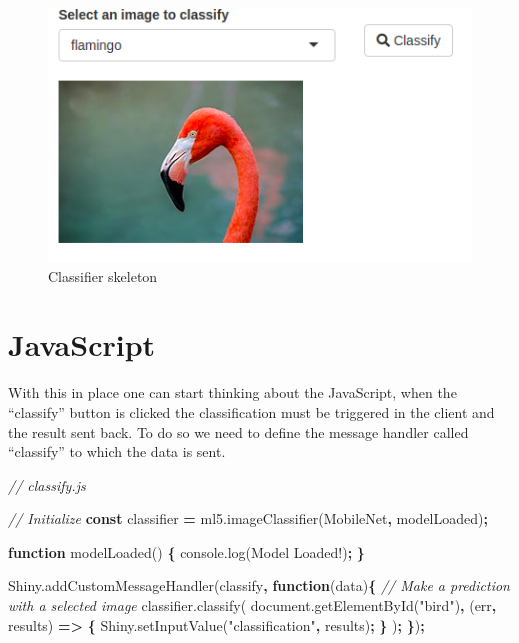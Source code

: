 \documentclass[
]{krantz}
\makeatletter
\newenvironment{Shaded}{\begin{snugshade}}{\end{snugshade}}
\newcommand{\AttributeTok}[1]{\textcolor[rgb]{0.61,0.61,0.61}{#1}}
\newcommand{\CommentTok}[1]{\textcolor[rgb]{0.37,0.37,0.37}{\textit{#1}}}
\newcommand{\KeywordTok}[1]{\textcolor[rgb]{0.27,0.27,0.27}{\textbf{#1}}}
\newcommand{\NormalTok}[1]{#1}
\newcommand{\OperatorTok}[1]{\textcolor[rgb]{0.43,0.43,0.43}{\textbf{#1}}}
\newcommand{\StringTok}[1]{\textcolor[rgb]{0.5,0.5,0.5}{#1}}
\newcommand{\VariableTok}[1]{\textcolor[rgb]{0,0,0}{#1}}
\newenvironment{kframe}{%
\medskip{}
\setlength{\fboxsep}{.8em}
 \def\at@end@of@kframe{}%
 \ifinner\ifhmode%
  \def\at@end@of@kframe{\end{minipage}}%
  \begin{minipage}{\columnwidth}%
 \fi\fi%
 \def\FrameCommand##1{\hskip\@totalleftmargin \hskip-\fboxsep
 \colorbox{shadecolor}{##1}\hskip-\fboxsep
     \hskip-\linewidth \hskip-\@totalleftmargin \hskip\columnwidth}%
 \MakeFramed {\advance\hsize-\width
   \@totalleftmargin\z@ \linewidth\hsize
   \@setminipage}}%
 {\par\unskip\endMakeFramed%
 \at@end@of@kframe}
\renewenvironment{Shaded}{\begin{kframe}}{\end{kframe}}
\makeatother
\begin{document}
\begin{figure}
\centering
\includegraphics{images/ml5-init.png}
\caption{Classifier skeleton}
\end{figure}

\hypertarget{javascript}{%
\section{JavaScript}\label{javascript}}

With this in place one can start thinking about the JavaScript, when the ``classify'' button is clicked the classification must be triggered in the client and the result sent back. To do so we need to define the message handler called ``classify'' to which the data is sent.

\begin{Shaded}
\begin{Highlighting}[]
\CommentTok{// classify.js}

\CommentTok{// Initialize }
\KeywordTok{const}\NormalTok{ classifier }\OperatorTok{=} \VariableTok{ml5}\NormalTok{.}\AttributeTok{imageClassifier}\NormalTok{(}\StringTok{\textquotesingle{}MobileNet\textquotesingle{}}\OperatorTok{,}\NormalTok{ modelLoaded)}\OperatorTok{;}

\KeywordTok{function} \AttributeTok{modelLoaded}\NormalTok{() }\OperatorTok{\{}
  \VariableTok{console}\NormalTok{.}\AttributeTok{log}\NormalTok{(}\StringTok{\textquotesingle{}Model Loaded!\textquotesingle{}}\NormalTok{)}\OperatorTok{;}
\OperatorTok{\}}

\VariableTok{Shiny}\NormalTok{.}\AttributeTok{addCustomMessageHandler}\NormalTok{(}\StringTok{\textquotesingle{}classify\textquotesingle{}}\OperatorTok{,} \KeywordTok{function}\NormalTok{(data)}\OperatorTok{\{}
  \CommentTok{// Make a prediction with a selected image}
  \VariableTok{classifier}\NormalTok{.}\AttributeTok{classify}\NormalTok{(}
    \VariableTok{document}\NormalTok{.}\AttributeTok{getElementById}\NormalTok{(}\StringTok{"bird"}\NormalTok{)}\OperatorTok{,}\NormalTok{ (err}\OperatorTok{,}\NormalTok{ results) }\KeywordTok{=>} \OperatorTok{\{}
      \VariableTok{Shiny}\NormalTok{.}\AttributeTok{setInputValue}\NormalTok{(}\StringTok{"classification"}\OperatorTok{,}\NormalTok{ results)}\OperatorTok{;}
    \OperatorTok{\}}
\NormalTok{  )}\OperatorTok{;}
\OperatorTok{\}}\NormalTok{)}\OperatorTok{;}
\end{Highlighting}
\end{Shaded}
\end{document}
